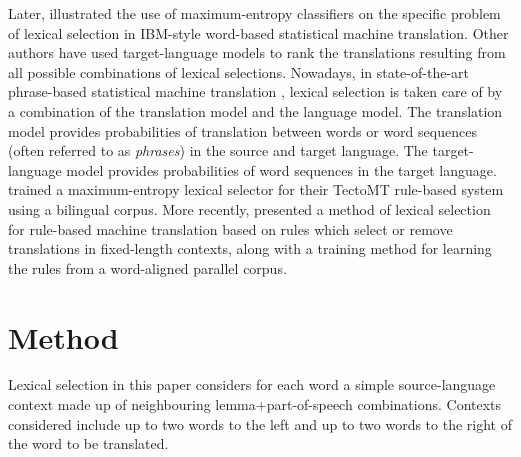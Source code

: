 \documentclass[11pt]{article}
\newcommand{\comment}[1]{\todo{#1}}
\begin{document}
Later, \cite{berger1996} illustrated the use of maximum-entropy classifiers
on the specific problem of lexical selection in IBM-style word-based
statistical machine translation. Other authors
\citep{melero07a} have used target-language models to rank %
the translations resulting from all possible combinations of lexical
selections.  Nowadays, in state-of-the-art phrase-based statistical
machine translation \citep{koehn2009statistical}, lexical selection is
taken care of by a combination of the translation model and the
language model. The translation model provides probabilities of
translation between words or word sequences (often referred to as
\emph{phrases}) in the source and target language. The target-language
model provides probabilities of word sequences in the target language.
\cite{marechek10} trained a maximum-entropy lexical selector for their TectoMT rule-based system
using a bilingual corpus.  More recently, \cite{tyers12a} presented a
method of lexical selection for rule-based machine translation based
on rules which select or remove translations in fixed-length contexts,
along with a training method for learning the rules from a
word-aligned parallel corpus. 



\section{Method}


Lexical selection in this paper considers for
each word a simple source-language context made up of neighbouring
lemma+part-of-speech combinations. Contexts considered include up to
two words to the left and up to two words to the right of the word to
be translated. 
\end{document}
